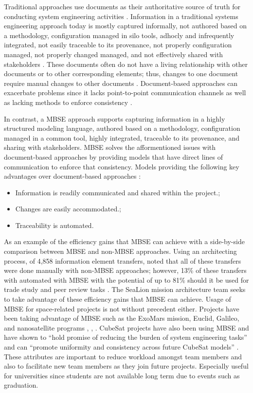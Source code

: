 \documentclass[journal,article,submit,pdftex,moreauthors]{Definitions/mdpi}
\begin{document}
Traditional approaches use documents as their authoritative source of truth for conducting system engineering activities \cite{architecting_spacecraft}.  Information in a traditional systems engineering approach today is mostly captured informally, not authored based on a methodology, configuration managed in silo tools, adhocly and infrequently integrated, not easily traceable to its provenance, not properly configuration managed, not properly changed managed, and not effectively shared with stakeholders \cite{caesar_model_based_approach}.  These documents often do not have a living relationship with other documents or to other corresponding elements; thus, changes to one document require manual changes to other documents \cite{ibm_mbse}.  Document-based approaches can exacerbate problems since it lacks point-to-point communication channels as well as lacking methods to enforce consistency \cite{call_herber_2022}.  

In contrast, a MBSE approach supports capturing information in a highly structured modeling language, authored based on a methodology, configuration managed in a common tool, highly integrated, traceable to its provenance, and sharing with stakeholders.  MBSE solves the afformentioned issues with document-based approaches by providing models that have direct lines of communication to enforce that consistency.  Models providing the following key advantages over document-based approaches \cite{ibm_mbse}: 

\begin{itemize}
	\item	Information is readily communicated and shared within the project.;
	\item	Changes are easily accommodated.;
	\item	Traceability is automated.
\end{itemize}

As an example of the efficiency gains that MBSE can achieve with a side-by-side comparison between MBSE and non-MBSE approaches.  Using an architecting process, of 4,858 information element transfers, noted that all of these transfers were done manually with non-MBSE approaches; however, 13\% of these transfers with automated with MBSE with the potential of up to 81\% should it be used for trade study and peer review tasks \cite{younse_cameron_bradley_2021}.  The SeaLion mission architecture team seeks to take advantage of these efficiency gains that MBSE can achieve.  Usage of MBSE for space-related projects is not without precedent either.  Projects have been taking advantage of MBSE such as the ExoMars mission, Euclid, Galileo, and nanosatellite programs \cite{mazzini}, \cite{esa}, \cite{nottage_corns_2012}.  CubeSat projects have also been using MBSE and have shown to “hold promise of reducing the burden of system engineering tasks” and can “promote uniformity and consistency across future CubeSat models” \cite{kaslow}.  These attributes are important to reduce workload amongst team members and also to facilitate new team members as they join future projects.  Especially useful for universities since students are not available long term due to events such as graduation.
\end{document}
